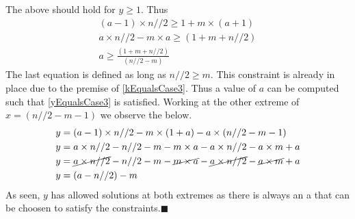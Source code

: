 \documentclass[10pt, twoside]{article}
\begin{document}
 The above should hold for $y \geq 1$. Thus
 \begin{align*}
 	(a-1)\times n//2 \geq 1 +  m \times (a+1) \\
 	a\times n//2 -m\times a \geq (1+m+n//2) \\
 	a \geq \frac{(1+m+n//2)}{(n//2-m)}
 \end{align*}
The last equation is defined as long as $n//2 \ge m$. This constraint is already in place due to the premise of \eqref{kEqualsCase3}. Thus a value of \textbf{$a$} can be computed such that \eqref{yEqualsCase3} is satisfied.\newline
Working at the other extreme of $x = (n//2 - m -1)$ we observe the below.
\begin{align*}
	y &= (a-1)\times n//2 -m \times(1+a) -a \times (n//2 -m -1) \\
	y &= a\times n//2 - n//2 -m -m\times a -a \times n//2 - a\times m + a \\
	y &= \cancel{a\times n//2} - n//2 -m -\cancel{m\times a} -\cancel{a \times n//2} - \cancel{a\times m} + a \\
	y &= (a - n//2) - m
\end{align*}
As seen, $y$ has allowed solutions at both extremes as there is always an a that can be choosen to satisfy the constraints.$\blacksquare$
\end{document}
